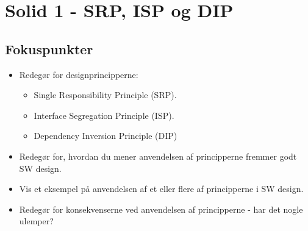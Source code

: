 \section{Solid 1 - SRP, ISP og DIP}

\subsection{Fokuspunkter}

\begin{itemize}
	\item Redegør for designprincipperne:
	\begin{itemize}
		\item Single Responsibility Principle (SRP).
		\item Interface Segregation Principle (ISP).
		\item Dependency Inversion Principle (DIP)
	\end{itemize}
	\item Redegør for, hvordan du mener anvendelsen af principperne fremmer godt SW design.
	\item Vis et eksempel på anvendelsen af et eller flere af principperne i SW design.
	\item Redegør for konsekvenserne ved anvendelsen af principperne - har det nogle ulemper?
\end{itemize}

